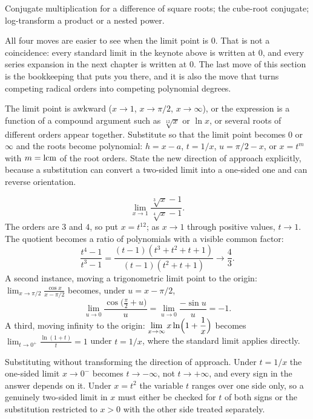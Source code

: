 \begin{seealsob}Conjugate multiplication for a difference of square roots; the cube-root conjugate; log-transform a product or a nested power.\end{seealsob}

All four moves are easier to see when the limit point is $0$. That is not a coincidence: every standard limit in the keynote above is written at $0$, and every series expansion in the next chapter is written at $0$. The last move of this section is the bookkeeping that puts you there, and it is also the move that turns competing radical orders into competing polynomial degrees.

\cue The limit point is awkward ($x\to1$, $x\to\pi/2$, $x\to\infty$), or the expression is a function of a compound argument such as $\sqrt[12]{x}$ or $\ln x$, or several roots of different orders appear together.
\method Substitute so that the limit point becomes $0$ or $\infty$ and the roots become polynomial: $h=x-a$, $t=1/x$, $u=\pi/2-x$, or $x=t^{m}$ with $m=\operatorname{lcm}$ of the root orders. State the new direction of approach explicitly, because a substitution can convert a two-sided limit into a one-sided one and can reverse orientation.

\begin{worked}
\[\lim_{x\to1}\frac{\sqrt[3]{x}-1}{\sqrt[4]{x}-1}.\]
The orders are $3$ and $4$, so put $x=t^{12}$; as $x\to1$ through positive values, $t\to1$. The quotient becomes a ratio of polynomials with a visible common factor:
\[\frac{t^{4}-1}{t^{3}-1}=\frac{(t-1)(t^{3}+t^{2}+t+1)}{(t-1)(t^{2}+t+1)}\longrightarrow\frac{4}{3}.\]
A second instance, moving a trigonometric limit point to the origin: $\displaystyle\lim_{x\to\pi/2}\frac{\cos x}{x-\pi/2}$ becomes, under $u=x-\pi/2$,
\[\lim_{u\to0}\frac{\cos\bigl(\tfrac\pi2+u\bigr)}{u}=\lim_{u\to0}\frac{-\sin u}{u}=-1 .\]
A third, moving infinity to the origin: $\displaystyle\lim_{x\to\infty}x\ln\Bigl(1+\frac1x\Bigr)$ becomes $\displaystyle\lim_{t\to0^{+}}\frac{\ln(1+t)}{t}=1$ under $t=1/x$, where the standard limit applies directly.
\end{worked}

\begin{trap}
Substituting without transforming the direction of approach. Under $t=1/x$ the one-sided limit $x\to0^{-}$ becomes $t\to-\infty$, not $t\to+\infty$, and every sign in the answer depends on it. Under $x=t^{2}$ the variable $t$ ranges over one side only, so a genuinely two-sided limit in $x$ must either be checked for $t$ of both signs or the substitution restricted to $x>0$ with the other side treated separately.
\end{trap}

